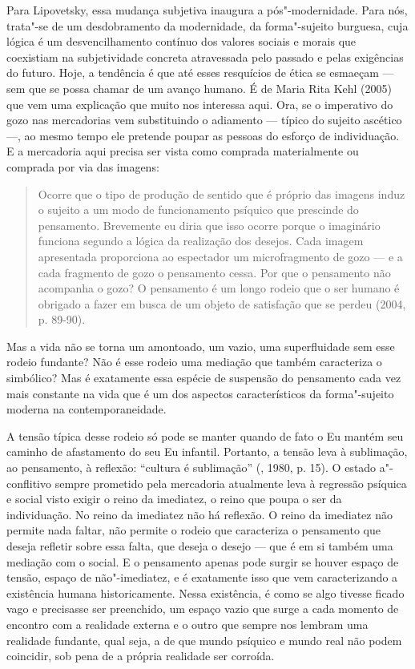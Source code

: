 Para Lipovetsky, essa mudança subjetiva inaugura a pós"-modernidade. Para
nós, trata"-se de um desdobramento da modernidade, da forma"-sujeito
burguesa, cuja lógica é um desvencilhamento contínuo dos valores sociais
e morais que coexistiam na subjetividade concreta atravessada pelo
passado e pelas exigências do futuro. Hoje, a tendência é que até esses
resquícios de ética se esmaeçam --- sem que se possa chamar de um avanço
humano. É de Maria Rita Kehl (2005) que vem uma explicação que muito nos
interessa aqui. Ora, se o imperativo do gozo nas mercadorias vem
substituindo o adiamento --- típico do sujeito ascético ---, ao mesmo
tempo ele pretende poupar as pessoas do esforço de individuação. E a
mercadoria aqui precisa ser vista como comprada materialmente ou
comprada por via das imagens:

\begin{quote}
Ocorre que o tipo de produção de sentido que é próprio das imagens induz
o sujeito a um modo de funcionamento psíquico que prescinde do
pensamento. Brevemente eu diria que isso ocorre porque o imaginário
funciona segundo a lógica da realização dos desejos. Cada imagem
apresentada proporciona ao espectador um microfragmento de gozo --- e a
cada fragmento de gozo o pensamento cessa. Por que o pensamento não
acompanha o gozo? O pensamento é um longo rodeio que o ser humano é
obrigado a fazer em busca de um objeto de satisfação que se perdeu
(2004, p. 89-90).
\end{quote}

Mas a vida não se torna um amontoado, um vazio, uma superfluidade sem
esse rodeio fundante? Não é esse rodeio uma mediação que também
caracteriza o simbólico? Mas é exatamente essa espécie de suspensão do
pensamento cada vez mais constante na vida que é um dos aspectos
característicos da forma"-sujeito moderna na contemporaneidade.

A tensão típica desse rodeio só pode se manter quando de fato o Eu
mantém seu caminho de afastamento do seu Eu infantil. Portanto, a tensão
leva à sublimação, ao pensamento, à reflexão: ``cultura é sublimação''
(, 1980, p. 15). O estado a"-conflitivo sempre prometido pela
mercadoria atualmente leva à regressão psíquica e social visto exigir o
reino da imediatez, o reino que poupa o ser da individuação. No reino da
imediatez não há reflexão. O reino da imediatez não permite nada faltar,
não permite o rodeio que caracteriza o pensamento que deseja refletir
sobre essa falta, que deseja o desejo --- que é em si também uma
mediação com o social. E o pensamento apenas pode surgir se houver
espaço de tensão, espaço de não"-imediatez, e é exatamente isso que vem
caracterizando a existência humana historicamente. Nessa existência, é
como se algo tivesse ficado vago e precisasse ser preenchido, um espaço
vazio que surge a cada momento de encontro com a realidade externa e o
outro que sempre nos lembram uma realidade fundante, qual seja, a de que mundo psíquico e mundo real não podem coincidir, sob pena de a própria realidade ser corroída.


